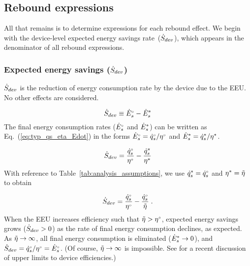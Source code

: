 












\subsection{Rebound expressions}
\label{sec:rebound_expressions}

All that remains is to determine expressions for each rebound effect.
We begin with the device-level expected energy savings rate~($\dot{S}_{dev}$), which
appears in the denominator of all rebound expressions.


\subsubsection{Expected energy savings ($\dot{S}_{dev}$)} 
\label{sec:Sdot}

$\dot{S}_{dev}$ is the reduction of energy consumption rate
by the device due to the EEU.
No other effects are considered.

\begin{equation} \label{eq:S_dot_def}
  \dot{S}_{dev} \equiv {}{\dot{E}}^{\scriptscriptstyle \circ}_s - {\dot{E}}^*_s
\end{equation}
%
The final energy consumption rates (${}{\dot{E}}^{\scriptscriptstyle \circ}_s$ and ${\dot{E}}^*_s$) 
can be written as Eq.~(\ref{eq:typ_qs_eta_Edot}) in the forms
${}{\dot{E}}^{\scriptscriptstyle \circ}_s = {}{\dot{q}}^{\scriptscriptstyle \circ}_s/{}{\eta}^{\scriptscriptstyle \circ}$ and 
${\dot{E}}^*_s = {\dot{q}}^*_s/{\eta}^*$. 

\begin{equation}
  \dot{S}_{dev} = \frac{{}{\dot{q}}^{\scriptscriptstyle \circ}_s}{{}{\eta}^{\scriptscriptstyle \circ}} - \frac{{\dot{q}}^*_s}{{\eta}^*}
\end{equation}
%
With reference to Table~\ref{tab:analysis_assumptions}, 
we use ${\dot{q}}^*_s = {}{\dot{q}}^{\scriptscriptstyle \circ}_s$ and ${\eta}^* = \tilde{\eta}$ to obtain

\begin{equation}
  \dot{S}_{dev} = \frac{{}{\dot{q}}^{\scriptscriptstyle \circ}_s}{{}{\eta}^{\scriptscriptstyle \circ}} - \frac{{}{\dot{q}}^{\scriptscriptstyle \circ}_s}{\tilde{\eta}} \; .
\end{equation}
%
When the EEU increases efficiency such that $\tilde{\eta} > {}{\eta}^{\scriptscriptstyle \circ}$,
expected energy savings grows ($\dot{S}_{dev} > 0$)
as the rate of final energy consumption declines,
as expected.
As $\tilde{\eta} \rightarrow \infty$,
all final energy consumption is eliminated (${\dot{E}}^*_s \rightarrow 0$), and
$\dot{S}_{dev} = {}{\dot{q}}^{\scriptscriptstyle \circ}_s/{}{\eta}^{\scriptscriptstyle \circ} = {}{\dot{E}}^{\scriptscriptstyle \circ}_s$.
(Of course, $\tilde{\eta} \rightarrow \infty$ is impossible. 
See \citet{Paoli:2020aa} for a recent discussion of upper limits to device efficiencies.)

